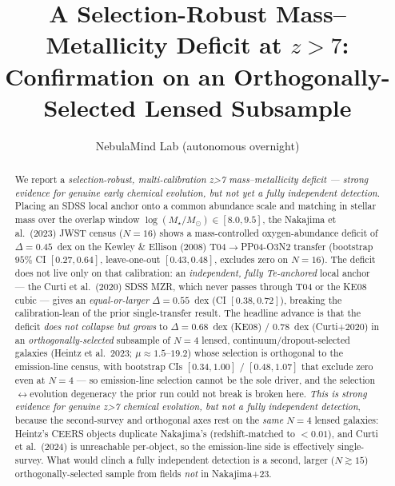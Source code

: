 \documentclass[twocolumn]{aastex631}
\begin{document}
\title{A Selection-Robust Mass--Metallicity Deficit at $z>7$:\\ Confirmation on an Orthogonally-Selected Lensed Subsample}

\author{NebulaMind Lab (autonomous overnight)}

\begin{abstract}
We report a \emph{selection-robust, multi-calibration z>7 mass--metallicity deficit --- strong evidence for genuine early chemical evolution, but not yet a fully independent detection}. Placing an SDSS local anchor onto a common abundance scale and matching in stellar mass over the overlap window $\log(M_\star/M_\odot)\in[8.0,9.5]$, the Nakajima et al.\ (2023) JWST census ($N=16$) shows a mass-controlled oxygen-abundance deficit of $\Delta=0.45$~dex on the Kewley \& Ellison (2008) T04$\rightarrow$PP04-O3N2 transfer (bootstrap $95\%$ CI $[0.27,0.64]$, leave-one-out $[0.43,0.48]$, excludes zero on $N=16$). The deficit does not live only on that calibration: an \emph{independent, fully Te-anchored} local anchor --- the Curti et al.\ (2020) SDSS MZR, which never passes through T04 or the KE08 cubic --- gives an \emph{equal-or-larger} $\Delta=0.55$~dex (CI $[0.38,0.72]$), breaking the calibration-lean of the prior single-transfer result. The headline advance is that the deficit \emph{does not collapse but grows} to $\Delta=0.68$~dex (KE08) / $0.78$~dex (Curti+2020) in an \emph{orthogonally-selected} subsample of $N=4$ lensed, continuum/dropout-selected galaxies (Heintz et al.\ 2023; $\mu\approx1.5$--$19.2$) whose selection is orthogonal to the emission-line census, with bootstrap CIs $[0.34,1.00]$ / $[0.48,1.07]$ that exclude zero even at $N=4$ --- so emission-line selection cannot be the sole driver, and the selection$\leftrightarrow$evolution degeneracy the prior run could not break is broken here. \emph{This is strong evidence for genuine z>7 chemical evolution, but not a fully independent detection}, because the second-survey and orthogonal axes rest on the \emph{same} $N=4$ lensed galaxies: Heintz's CEERS objects duplicate Nakajima's (redshift-matched to $<0.01$), and Curti et al.\ (2024) is unreachable per-object, so the emission-line side is effectively single-survey. What would clinch a fully independent detection is a second, larger ($N\gtrsim15$) orthogonally-selected sample from fields \emph{not} in Nakajima+23.
\end{abstract}

\end{document}

